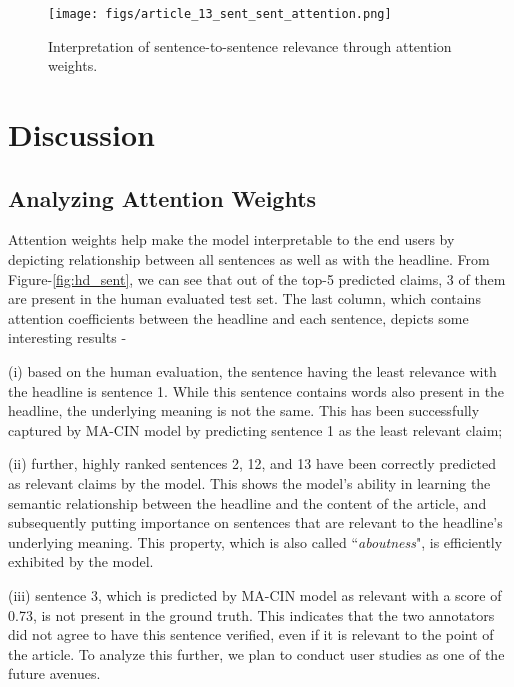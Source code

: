 \documentclass[11pt,a4paper]{article}
\begin{document}
\begin{figure}[ht]
\begin{center}
\texttt{[image: figs/article\_13\_sent\_sent\_attention.png]}
\caption{\label{fig:sent_sent}Interpretation of sentence-to-sentence relevance through attention weights.}
\end{center}
\end{figure}
\addtolength{\textfloatsep}{-0.30in}

\section{Discussion}
\label{sec:discuss}

\subsection{Analyzing Attention Weights}
\label{sect:analysis}
Attention weights help make the model interpretable to the end users by depicting relationship between all sentences as well as with the headline. From Figure-\ref{fig:hd_sent}, we can see that out of the top-5 predicted claims, 3 of them are present in the human evaluated test set. The last column, which contains attention coefficients between the headline and each sentence, depicts some interesting results - 

(i) based on the human evaluation, the sentence having the least relevance with the headline is sentence 1. While this sentence contains words also present in the headline, the underlying meaning is not the same. This has been successfully captured by MA-CIN model by predicting sentence 1 as the least relevant claim;

(ii) further, highly ranked sentences 2, 12, and 13 have been correctly predicted as relevant claims by the model. This shows the model's ability in learning the semantic relationship between the headline and the content of the article, and subsequently putting importance on sentences that are relevant to the headline's underlying meaning. This property, which is also called ``\textit{aboutness}", is efficiently exhibited by the model.


(iii) sentence 3, which is predicted by MA-CIN model as relevant with a score of 0.73, is not present in the ground truth. This indicates that the two annotators did not agree to have this sentence verified, even if it is relevant to the point of the article. To analyze this further, we plan to conduct user studies as one of the future avenues.
\end{document}
